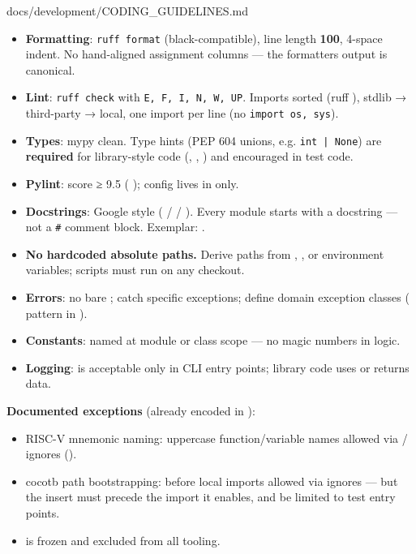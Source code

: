 \begin{relocated}{docs/development/CODING_GUIDELINES.md}
\begin{itemize}
\tightlist
\item
  \textbf{Formatting}: \texttt{ruff\ format} (black-compatible), line
  length \textbf{100}, 4-space indent. No hand-aligned assignment
  columns --- the formatter\textquotesingle s output is canonical.
\item
  \textbf{Lint}: \texttt{ruff\ check} with
  \texttt{E,\allowbreak{}\ F,\allowbreak{}\ I,\allowbreak{}\ N,\allowbreak{}\ W,\allowbreak{}\ UP}.
  Imports sorted (ruff ), stdlib → third-party → local, one
  import per line (no \texttt{import\ os,\allowbreak{}\ sys}).
\item
  \textbf{Types}: mypy clean. Type hints (PEP 604 unions, e.g.
  \texttt{int\ |\ None}) are \textbf{required} for library-style code
  (, , ) and encouraged in test code.
\item
  \textbf{Pylint}: score ≥ 9.5 ( );
  config lives in  only.
\item
  \textbf{Docstrings}: Google style ( /  /
  ). Every module starts with a docstring --- not a
  \texttt{\#} comment block. Exemplar: .
\item
  \textbf{No hardcoded absolute paths.} Derive paths from
  , , or environment variables; scripts
  must run on any checkout.
\item
  \textbf{Errors}: no bare ; catch specific exceptions;
  define domain exception classes (
  pattern in ).
\item
  \textbf{Constants}: named  at module or class scope
  --- no magic numbers in logic.
\item
  \textbf{Logging}:  is acceptable only in CLI entry
  points; library code uses  or returns data.
\end{itemize}

\textbf{Documented exceptions} (already encoded in
):

\begin{itemize}
\tightlist
\item
  RISC-V mnemonic naming: uppercase function/\allowbreak{}variable names
  allowed via / ignores
  ().
\item
  cocotb path bootstrapping:  before local
  imports allowed via  ignores --- but the insert must
  precede the import it enables, and be limited to test entry points.
\item
   is frozen and excluded from all tooling.
\end{itemize}


\end{relocated}
